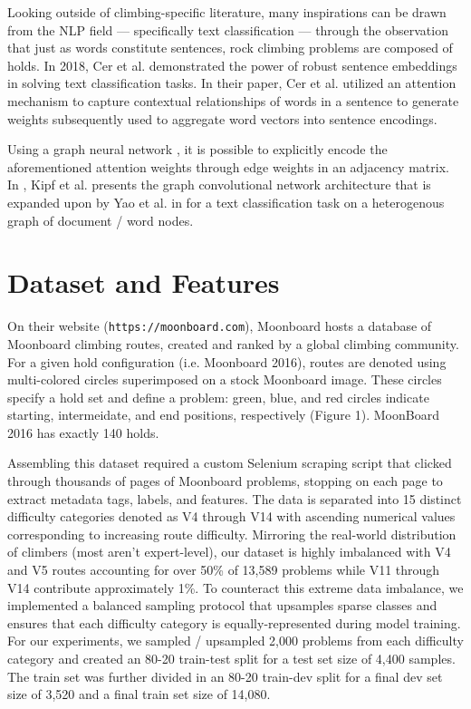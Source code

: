 \documentclass{article}
\begin{document}
Looking outside of climbing-specific literature, many inspirations can be drawn from the NLP field --- specifically text classification --- through the observation that just as words constitute sentences, rock climbing problems are composed of holds. In 2018, Cer et al. \cite{cer2018universal} demonstrated the power of robust sentence embeddings in solving text classification tasks. In their paper, Cer et al. utilized an attention mechanism to capture contextual relationships of words in a sentence to generate weights subsequently used to aggregate word vectors into sentence encodings. 

Using a graph neural network \cite{battaglia2018relational}, it is possible to explicitly encode the aforementioned attention weights through edge weights in an adjacency matrix. In \cite{kipf2016semisupervised}, Kipf et al. presents the graph convolutional network architecture that is expanded upon by Yao et al. in \cite{yao2018graph} for a text classification task on a heterogenous graph of document / word nodes.

\section{Dataset and Features}
On their website (\texttt{https://moonboard.com}), Moonboard hosts a database of Moonboard climbing routes, created and ranked by a global climbing community. For a given hold configuration (i.e. Moonboard 2016), routes are denoted using multi-colored circles superimposed on a stock Moonboard image. These circles specify a hold set and define a problem: green, blue, and red circles indicate starting, intermeidate, and end positions, respectively (Figure 1). MoonBoard 2016 has exactly 140 holds.

Assembling this dataset required a custom Selenium scraping script that clicked through thousands of pages of Moonboard problems, stopping on each page to extract metadata tags, labels, and features. The data is separated into 15 distinct difficulty categories denoted as V4 through V14 with ascending numerical values corresponding to increasing route difficulty. Mirroring the real-world distribution of climbers (most aren't expert-level), our dataset is highly imbalanced with V4 and V5 routes accounting for over 50\% of 13,589 problems while V11 through V14 contribute approximately 1\%. To counteract this extreme data imbalance, we implemented a balanced sampling protocol that upsamples sparse classes and ensures that each difficulty category is equally-represented during model training. For our experiments, we sampled / upsampled 2,000 problems from each difficulty category and created an 80-20 train-test split for a test set size of 4,400 samples. The train set was further divided in an 80-20 train-dev split for a final dev set size of 3,520 and a final train set size of 14,080.
\end{document}
